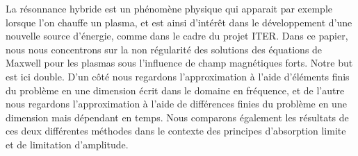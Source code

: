 La r\'esonnance hybride est un ph\'enom\`ene physique qui apparait par exemple lorsque l'on chauffe un plasma, et est ainsi d'int\'er\^et dans le d\'eveloppement d'une nouvelle source d'\'energie, comme dans le cadre du projet ITER. Dans ce papier, nous nous concentrons sur la non r\'egularit\'e des solutions des \'equations de Maxwell pour les plasmas sous l'influence de champ magn\'etiques forts. Notre but est ici double. D'un c\^ot\'e nous regardons l'approximation \`a l'aide d'\'el\'ements finis du probl\`eme en une dimension \'ecrit dans le domaine en fr\'equence, et de l'autre nous regardons l'approximation \`a l'aide de diff\'erences finies du probl\`eme en une dimension mais d\'ependant en temps. Nous comparons \'egalement les r\'esultats de ces deux diff\'erentes m\'ethodes dans le contexte des principes d'absorption limite et de limitation d'amplitude.